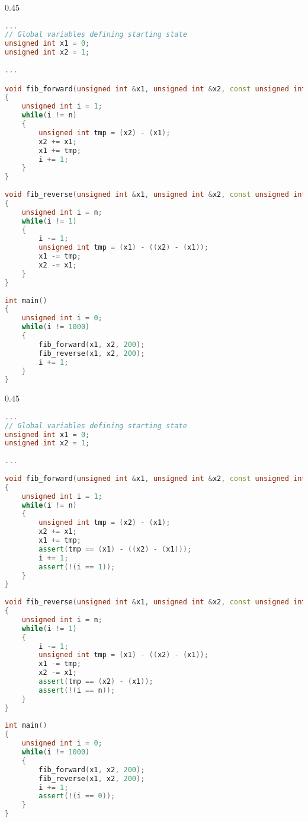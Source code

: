 \begin{varwidth}[t]{0.45\textwidth}
\begin{lstlisting}[language=C++, caption={Optimized Fibonacci program.}]
...
// Global variables defining starting state
unsigned int x1 = 0;
unsigned int x2 = 1;
 
...

void fib_forward(unsigned int &x1, unsigned int &x2, const unsigned int n)
{
    unsigned int i = 1;
    while(i != n)
    {
        unsigned int tmp = (x2) - (x1);
        x2 += x1;
        x1 += tmp;
        i += 1;
    }
}
 
void fib_reverse(unsigned int &x1, unsigned int &x2, const unsigned int n)
{
    unsigned int i = n;
    while(i != 1)
    {
        i -= 1;
        unsigned int tmp = (x1) - ((x2) - (x1));
        x1 -= tmp;
        x2 -= x1;
    }
}
 
int main()
{
    unsigned int i = 0;
    while(i != 1000)
    {
        fib_forward(x1, x2, 200);
        fib_reverse(x1, x2, 200);
        i += 1;
    }
}
\end{lstlisting}
\end{varwidth}
\hspace{4em}
\begin{varwidth}[t]{0.45\textwidth}
\begin{lstlisting}[language=C++, caption={Unoptimized Fibonacci program.}]
... 
// Global variables defining starting state
unsigned int x1 = 0;
unsigned int x2 = 1;
 
...
 
void fib_forward(unsigned int &x1, unsigned int &x2, const unsigned int n)
{
    unsigned int i = 1;
    while(i != n)
    {
        unsigned int tmp = (x2) - (x1);
        x2 += x1;
        x1 += tmp;
        assert(tmp == (x1) - ((x2) - (x1)));
        i += 1;
        assert(!(i == 1));
    }
}
 
void fib_reverse(unsigned int &x1, unsigned int &x2, const unsigned int n)
{
    unsigned int i = n;
    while(i != 1)
    {
        i -= 1;
        unsigned int tmp = (x1) - ((x2) - (x1));
        x1 -= tmp;
        x2 -= x1;
        assert(tmp == (x2) - (x1));
        assert(!(i == n));
    }
}
 
int main()
{
    unsigned int i = 0;
    while(i != 1000)
    {
        fib_forward(x1, x2, 200);
        fib_reverse(x1, x2, 200);
        i += 1;
        assert(!(i == 0));
    }
}
\end{lstlisting}
\end{varwidth}